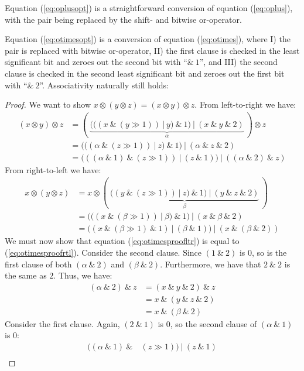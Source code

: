 Equation (\ref{eq:oplusopt}) is a straightforward conversion of equation
(\ref{eq:oplus}), with the pair being replaced by the shift- and bitwise or-operator.

Equation (\ref{eq:otimesopt}) is a conversion of equation (\ref{eq:otimes}),
where I) the pair is replaced with bitwise or-operator, II) the first clause is checked
in the least significant bit and zeroes out the second bit with ``$\&~1$'', and
III) the second clause is checked in the second least significant bit and zeroes
out the first bit with ``$\&~2$''. Associativity naturally still holds:

\begin{proof}
  We want to show $x \otimes (y \otimes z) = (x \otimes y) \otimes z$. From left-to-right we have:
\begin{align}
  (x \otimes y) \otimes z &= (~\underbrace{(((x~\&~(y \gg 1))~|~y)~\&~1)~|~(x~\&~y~\&~2)}_{\alpha}~) \otimes z\\
              &= (((\alpha~\&~(z \gg 1))~|~z)~\&~1)~|~(\alpha~\&~z~\&~2)\\
              \label{eq:otimesproofltr}
              &= (((\alpha~\&~1)~\&~(z \gg 1))~|~(z~\&~1))~|~((\alpha~\&~2)~\&~z)
\end{align}
From right-to-left we have:
\begin{align}
  x \otimes (y \otimes z) &= x \otimes (~\underbrace{((y~\&~(z \gg 1))~|~z)~\&~1)~|~(y~\&~z~\&~2)}_{\beta}~)\\
  &= (((x~\&~(\beta \gg 1))~|~\beta)~\&~1)~|~(x~\&~\beta~\&~2)\\
  \label{eq:otimesproofrtl}
  &= ((x~\&~(\beta \gg 1)~\&~1)~|~(\beta~\&~1))~|~(x~\&~(\beta~\&~2))
\end{align}
We must now show that equation (\ref{eq:otimesproofltr}) is equal to
(\ref{eq:otimesproofrtl}). Consider the second clause. Since $(1~\&~2)$ is $0$,
so is the first clause of both $(\alpha~\&~2)$ and $(\beta~\&~2)$. Furthermore, we have
that $2~\&~2$ is the same as $2$. Thus, we have:
\begin{align}
  (\alpha~\&~2)~\&~z &= (x~\&~y~\&~2)~\&~z\\
                &= x~\&~(y~\&~z~\&~2)\\
                &= x~\&~(\beta~\&~2)
\end{align}
Consider the first clause. Again, $(2~\&~1)$ is $0$, so the second clause of $(\alpha~\&~1)$ is $0$:
\begin{align}
  ((\alpha~\&~1)~\&~&(z \gg 1))~|~(z~\&~1) \\

\end{align}
\end{proof}
